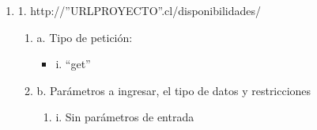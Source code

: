 \begin{enumerate}
    \item 1. http://”URLPROYECTO”.cl/disponibilidades/
    \begin{enumerate}
        \item a. Tipo de petición:
            \begin{itemize}
               \item i. “get”
            \end{itemize}
        \item b. Parámetros a ingresar, el tipo de datos y restricciones
            \begin{enumerate}
                \item i. Sin parámetros de entrada
            \end{enumerate}
    \end{enumerate}


\end{enumerate}
